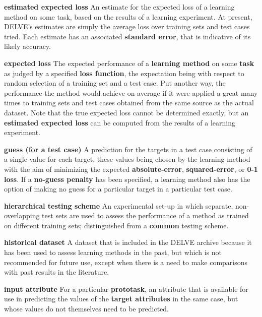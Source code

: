 \begin{list}{}{%
\setlength{\itemsep}{0in}%
\setlength{\leftmargin}{2.25in}%
\setlength{\labelsep}{0in}%
\setlength{\labelwidth}{2.25in}}
\item[\bf estimated expected loss \hfill]
An estimate for the expected loss of a learning method on some task,
based on the results of a learning experiment.  At present, DELVE's
estimates are simply the average loss over training sets and test cases
tried.  Each estimate has an associated {\bf standard error}, that is
indicative of its likely accuracy.

\item[\bf expected loss \hfill]
The expected performance of a {\bf learning method} on some {\bf task} 
as judged by a specified {\bf loss function}, the expectation being with 
respect to random selection of a training set and a test case.  Put another 
way, the performance the method would achieve on average if it were
applied a great many times to training sets and test cases obtained from
the same source as the actual dataset.  Note that the true expected loss cannot 
be determined exactly, but an {\bf estimated expected loss} can be computed 
from the results of a learning experiment.

\item[\bf guess (for a test case) \hfill]
A prediction for the targets in a test case consisting of a single
value for each target, these values being chosen by the learning 
method with the aim of minimizing the expected {\bf absolute-error},
{\bf squared-error}, or {\bf 0-1 loss}.  If a {\bf no-guess penalty}
has been specified, a learning method also has the option of
making no guess for a particular target in a particular test case.

\item[\bf hierarchical testing scheme \hfill]
An experimental set-up in which separate, non-overlapping test sets are
used to assess the performance of a method as trained on different
training sets; distinguished from a {\bf common} testing scheme.

\item[\bf historical dataset \hfill]
A dataset that is included in the DELVE archive because it has been used
to assess learning methods in the past, but which is not recommended
for future use, except when there is a need to make comparisons with
past results in the literature.

\item[\bf input attribute \hfill]
For a particular {\bf prototask}, an attribute that is available
for use in predicting the values of the {\bf target attributes} in
the same case, but whose values do not themselves need to be predicted.


\end{list}
